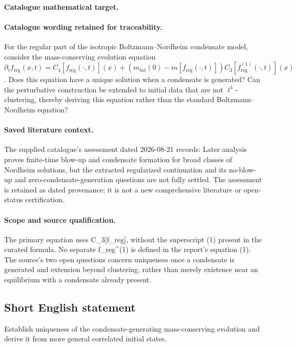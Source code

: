 \documentclass[11pt]{article}
\begin{document}
\paragraph{Catalogue mathematical target.}
\paragraph{Catalogue wording retained for traceability.}
For the regular part of the isotropic Boltzmann–Nordheim condensate model, consider the mass-conserving evolution equation $\partial_t f_{\mathrm{reg}}(x,t)=C_4[f_{\mathrm{reg}}(\cdot,t)](x)+(m_{\mathrm{tot}}(0)-m[f_{\mathrm{reg}}(\cdot,t)])C_3[f_{\mathrm{reg}}^{(1)}(\cdot,t)](x)$. Does this equation have a unique solution when a condensate is generated? Can the perturbative construction be extended to initial data that are not $\ell^1$-clustering, thereby deriving this equation rather than the standard Boltzmann–Nordheim equation?

\paragraph{Saved literature context.} The supplied catalogue's assessment dated 2026-08-21 records: Later analysis proves finite-time blow-up and condensate formation for broad classes of Nordheim solutions, but the extracted regularized continuation and its no-blow-up and zero-condensate-generation questions are not fully settled. The assessment is retained as dated provenance; it is not a new comprehensive literature or open-status certification.
\paragraph{Scope and source qualification.}The primary equation uses C_3[f_reg], without the superscript (1) present in the curated formula. No separate f_reg^(1) is defined in the report's equation (1). The source's two open questions concern uniqueness once a condensate is generated and extension beyond clustering, rather than merely existence near an equilibrium with a condensate already present.
\subsection{Short English statement}
Establish uniqueness of the condensate-generating mass-conserving evolution and derive it from more general correlated initial states.
\end{document}
